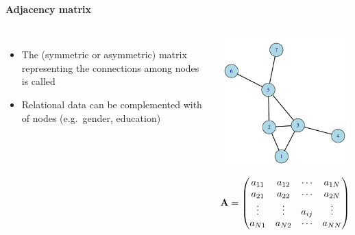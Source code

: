 \documentclass[8pt]{beamer}
\begin{document}
\begin{frame}
\frametitle{\insertsection}
\framesubtitle{Adjacency matrix}

\begin{columns}[c]
	\begin{itemize}
		\item The (symmetric or asymmetric) matrix representing the connections among nodes is called {\color{blue}{adjacency matrix}}
		\item Relational data can be complemented with {\color{blue}{attributes}} of nodes (e.g.\ gender, education)
	\end{itemize}

\centering
\includegraphics[width=5cm]{base}
\[\mathbf{A} =\left(\begin{array}{@{}cccc@{}}
  								a_{11}&a_{12}&\cdots &a_{1N} \\
  								a_{21}&a_{22}&\cdots &a_{2N} \\
  								\vdots & \vdots & a_{ij} & \vdots\\
  								a_{N1}&a_{N2}&\cdots &a_{NN}
								\end{array}\right)\]

\end{columns}

\end{frame}

\end{document}
